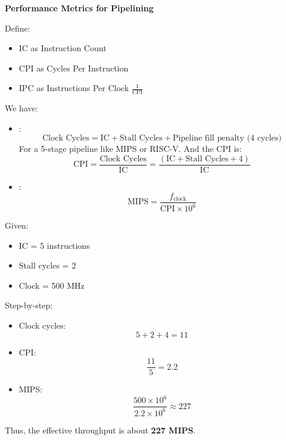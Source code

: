 \highspace
\begin{flushleft}
    \textcolor{Green3}{ \textbf{Performance Metrics for Pipelining}}
\end{flushleft}
Define:
\begin{itemize}
    \item IC as Instruction Count
    \item CPI as Cycles Per Instruction
    \item IPC as Instructions Per Clock $\frac{1}{\text{CPI}}$
\end{itemize}
We have:
\begin{itemize}
    \item {}:
    \begin{equation}
        \text{Clock Cycles} = \text{IC} + \text{Stall Cycles} + \text{Pipeline fill penalty (4 cycles)}
    \end{equation}
    For a 5-stage pipeline like MIPS or RISC-V. And the CPI is:
    \begin{equation}
        \text{CPI} = \dfrac{\text{Clock Cycles}}{\text{IC}} = \dfrac{\left(\text{IC} + \text{Stall Cycles} + 4\right)}{\text{IC}}
    \end{equation}

    \item {}:
    \begin{equation}
        \text{MIPS} = \dfrac{f_{\text{clock}}}{\text{CPI} \times 10^{6}}
    \end{equation}
\end{itemize}

\begin{examplebox}
    Given:
    \begin{itemize}
        \item IC = 5 instructions
        \item Stall cycles = 2
        \item Clock = 500 MHz
    \end{itemize}
    Step-by-step:
    \begin{itemize}
        \item Clock cycles:
        \begin{equation*}
            5 + 2 + 4 = 11
        \end{equation*}
        \item CPI:
        \begin{equation*}
            \frac{11}{5} = 2.2
        \end{equation*}
        \item MIPS:
        \begin{equation*}
            \frac{500 \times 10^6}{2.2 \times 10^6} \approx 227
        \end{equation*}
    \end{itemize}
    Thus, the effective throughput is about \textbf{227 MIPS}.
\end{examplebox}

